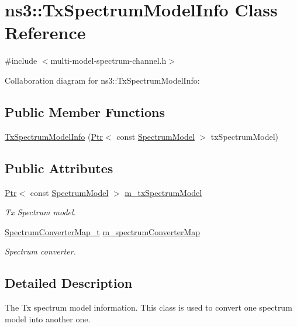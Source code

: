 \hypertarget{classns3_1_1TxSpectrumModelInfo}{}\section{ns3\+:\+:Tx\+Spectrum\+Model\+Info Class Reference}
\label{classns3_1_1TxSpectrumModelInfo}


{\ttfamily \#include $<$multi-\/model-\/spectrum-\/channel.\+h$>$}



Collaboration diagram for ns3\+:\+:Tx\+Spectrum\+Model\+Info\+:
\subsection*{Public Member Functions}
\begin{DoxyCompactItemize}
\item 
\hyperlink{classns3_1_1TxSpectrumModelInfo_aebed44c25e9aabd4e5ce703855bbeed1}{Tx\+Spectrum\+Model\+Info} (\hyperlink{classns3_1_1Ptr}{Ptr}$<$ const \hyperlink{classns3_1_1SpectrumModel}{Spectrum\+Model} $>$ tx\+Spectrum\+Model)
\end{DoxyCompactItemize}
\subsection*{Public Attributes}
\begin{DoxyCompactItemize}
\item 
\hyperlink{classns3_1_1Ptr}{Ptr}$<$ const \hyperlink{classns3_1_1SpectrumModel}{Spectrum\+Model} $>$ \hyperlink{classns3_1_1TxSpectrumModelInfo_a1b7bb35a36d4b41d43ac47b2d8cd2388}{m\+\_\+tx\+Spectrum\+Model}
\begin{DoxyCompactList}\small\item\em Tx Spectrum model. \end{DoxyCompactList}\item 
\hyperlink{group__spectrum_ga47089dbfa7f7955f2b2082c1da395450}{Spectrum\+Converter\+Map\+\_\+t} \hyperlink{classns3_1_1TxSpectrumModelInfo_ab17eef3b720aef8510d6e90759c8c409}{m\+\_\+spectrum\+Converter\+Map}
\begin{DoxyCompactList}\small\item\em Spectrum converter. \end{DoxyCompactList}\end{DoxyCompactItemize}


\subsection{Detailed Description}
The Tx spectrum model information. This class is used to convert one spectrum model into another one. 

